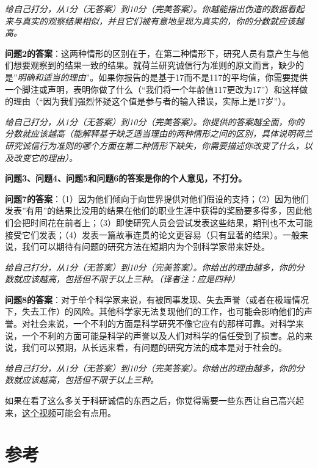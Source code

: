 \documentclass[
  letterpaper,
  DIV=11,
  numbers=noendperiod]{scrreprt}
\begin{document}
\emph{给自己打分，从1分（无答案）到10分（完美答案）。你越能指出伪造的数据看起来与真实的观察结果相似，并且它们被有意地呈现为真实的，你的分数就应该越高。}

\textbf{问题2的答案}：这两种情形的区别在于，在第二种情形下，研究人员有意产生与他们想要观察到的结果一致的结果。就荷兰研究诚信行为准则的原文而言，缺少的是''\emph{明确和适当的理由}''。如果你报告的是基于17而不是117的平均值，你需要提供一个脚注或声明，表明你做了什么（``我们将一个年龄值117更改为17''）和这样做的理由（``因为我们强烈怀疑这个值是参与者的输入错误，实际上是17岁''）。

\emph{给自己打分，从1分（无答案）到10分（完美答案）。你提供的答案越全面，你的分数就应该越高（能解释基于缺乏适当理由的两种情形之间的区别，具体说明荷兰研究诚信行为准则的哪个方面在第二种情形下缺失，你需要描述你改变了什么，以及改变它的理由）。}

\textbf{问题3、问题4、问题5和问题6的答案是你的个人意见，不打分。}

\textbf{问题7的答案}：（1）因为他们倾向于向世界提供对他们假设的支持；（2）因为他们发表''有用''的结果比没用的结果在他们的职业生涯中获得的奖励要多得多，因此他们会把时间花在前者上；（3）即使研究人员会尝试发表这些结果，期刊也不太可能接受它们发表；（4）发表一篇故事连贯的论文更容易（只有显著的结果）。一般来说，我们可以期待有问题的研究方法在短期内为个别科学家带来好处。

\emph{给自己打分，从1分（无答案）到10分（完美答案）。你给出的理由越多，你的分数就应该越高，包括但不限于以上三种。（译者注：应是四种）}

\textbf{问题8的答案}：对于单个科学家来说，有被同事发现、失去声誉（或者在极端情况下，失去工作）的风险。其他科学家无法复现他们的工作，也可能会影响他们的声誉。对社会来说，一个不利的方面是科学研究不像它应有的那样可靠。对科学来说，一个不利的方面可能是科学的声誉以及人们对科学的信任受到了损害。总的来说，我们可以预期，从长远来看，有问题的研究方法的成本是对于社会的。

\emph{给自己打分，从1分（无答案）到10分（完美答案）。你给出的理由越多，你的分数就应该越高，包括但不限于以上三种。}

如果在看了这么多关于科研诚信的东西之后，你觉得需要一些东西让自己高兴起来，\href{https://youtu.be/ZaNtz76dNSI}{这个视频}可能会有点用。


\hypertarget{ux53c2ux8003}{%
\chapter*{参考}\label{ux53c2ux8003}}
\end{document}
